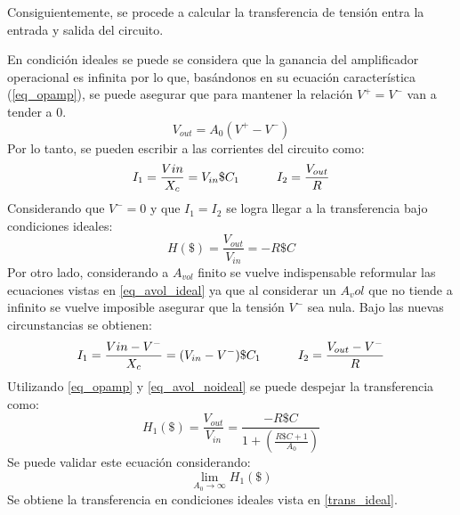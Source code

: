 Consiguientemente, se procede a calcular la transferencia de tensión entra
la entrada y salida del circuito. \par 
En condición ideales se puede se considera que la ganancia del
amplificador operacional es infinita por lo que, basándonos en 
su ecuación característica (\ref{eq_opamp}), se puede asegurar que para 
mantener la relación $V^+=V^-$ van a tender a 0.
\vspace{2mm}
\begin{equation*}
    V_{out}=A_0(V^+-V^-)
    \label{eq_opamp}
\end{equation*}
\vspace{2mm}
Por lo tanto, se pueden escribir a las corrientes del circuito como:
\vspace{2mm}
\begin{equation*}
    I_1=\frac{V{in}}{X_c}=V_{in}\$C_1 \indent \indent I_2=\frac{V_{out}}{R}
    \label{eq_avol_ideal}
\end{equation*}
\vspace{2mm}
Considerando que $V^-=0$ y que $I_1=I_2$ se logra llegar a la transferencia bajo 
condiciones ideales:
\vspace{2mm}
\begin{equation}
    H(\$)=\frac{V_{out}}{V_{in}}=-R\$C
    \label{trans_ideal}
\end{equation}
\vspace{2mm}
Por otro lado, considerando a $A_{vol}$ finito se vuelve indispensable reformular las
ecuaciones vistas en \ref{eq_avol_ideal} ya que al considerar un $A_vol$ que no 
tiende a infinito se vuelve imposible asegurar que la tensión $V^-$ sea nula. Bajo 
las nuevas circunstancias se obtienen:
\vspace{2mm}
\begin{equation*}
    I_1=\frac{V{in}-V^-}{X_c}=(V_{in}-V^-)\$C_1 \indent \indent I_2=\frac{V_{out}-V^-}{R}
    \label{eq_avol_noideal}
\end{equation*}
\vspace{2mm}
Utilizando \ref{eq_opamp} y \ref{eq_avol_noideal} se puede despejar la transferencia
como:
\vspace{2mm}
\begin{equation}
    H_1(\$)=\frac{V_{out}}{V_{in}}=\frac{-R\$C}{1+(\frac{R\$C+1}{A_0})}
    \label{trans_no_ideal}
\end{equation}
\vspace{2mm}
Se puede validar este ecuación considerando:
 $$\lim_{A_0\to\infty} H_1(\$)$$
Se obtiene la transferencia en condiciones ideales vista en \ref{trans_ideal}. \par
